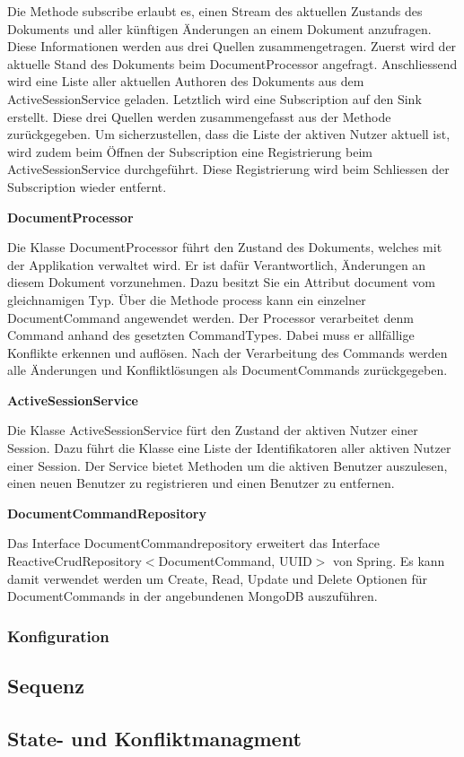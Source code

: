 Die Methode subscribe erlaubt es, einen Stream des aktuellen Zustands des Dokuments und aller künftigen Änderungen an einem Dokument anzufragen.
Diese Informationen werden aus drei Quellen zusammengetragen.
Zuerst wird der aktuelle Stand des Dokuments beim DocumentProcessor angefragt.
Anschliessend wird eine Liste aller aktuellen Authoren des Dokuments aus dem ActiveSessionService geladen.
Letztlich wird eine Subscription auf den Sink erstellt.
Diese drei Quellen werden zusammengefasst aus der Methode zurückgegeben.
Um sicherzustellen, dass die Liste der aktiven Nutzer aktuell ist, wird zudem beim Öffnen der Subscription eine Registrierung beim ActiveSessionService durchgeführt.
Diese Registrierung wird beim Schliessen der Subscription wieder entfernt.

\textbf{DocumentProcessor}

Die Klasse DocumentProcessor führt den Zustand des Dokuments, welches mit der Applikation verwaltet wird.
Er ist dafür Verantwortlich, Änderungen an diesem Dokument vorzunehmen.
Dazu besitzt Sie ein Attribut document vom gleichnamigen Typ.
Über die Methode process kann ein einzelner DocumentCommand angewendet werden.
Der Processor verarbeitet denm Command anhand des gesetzten CommandTypes.
Dabei muss er allfällige Konflikte erkennen und auflösen.
Nach der Verarbeitung des Commands werden alle Änderungen und Konfliktlösungen als DocumentCommands zurückgegeben.

\textbf{ActiveSessionService}

Die Klasse ActiveSessionService fürt den Zustand der aktiven Nutzer einer Session.
Dazu führt die Klasse eine Liste der Identifikatoren aller aktiven Nutzer einer Session.
Der Service bietet Methoden um die aktiven Benutzer auszulesen, einen neuen Benutzer zu registrieren und einen Benutzer zu entfernen.

\textbf{DocumentCommandRepository}

Das Interface DocumentCommandrepository erweitert das Interface ReactiveCrudRepository$<$DocumentCommand, UUID$>$ von Spring.
Es kann damit verwendet werden um Create, Read, Update und Delete Optionen für DocumentCommands in der angebundenen MongoDB auszuführen.

\clearpage

\subsubsection{Konfiguration}

\clearpage

\subsection{Sequenz}

\clearpage

\subsection{State- und Konfliktmanagment}

\clearpage
